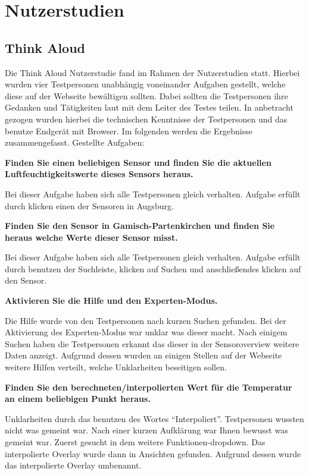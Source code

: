 \section{Nutzerstudien}
\subsection{Think Aloud}
Die Think Aloud Nutzerstudie fand im Rahmen der Nutzerstudien statt. Hierbei wurden vier Testpersonen unabhängig voneinander Aufgaben gestellt,
welche diese auf der Webseite bewältigen sollten. Dabei sollten die Testpersonen ihre Gedanken und Tätigkeiten laut mit dem Leiter des Testes teilen.
In anbetracht gezogen wurden hierbei die technischen Kenntnisse der Testpersonen und das benutze Endgerät mit Browser. Im folgenden werden die Ergebnisse zusammengefasst.
Gestellte Aufgaben:

\textbf{Finden Sie einen beliebigen Sensor und finden Sie die aktuellen Luftfeuchtigkeitswerte dieses Sensors heraus.}

Bei dieser Aufgabe haben sich alle Testpersonen gleich verhalten. 
Aufgabe erfüllt durch klicken einen der Sensoren in Augsburg.

\textbf{Finden Sie den Sensor in Gamisch-Partenkirchen und finden Sie heraus welche Werte dieser Sensor misst.}

Bei dieser Aufgabe haben sich alle Testpersonen gleich verhalten. 
Aufgabe erfüllt durch benutzen der Suchleiste, klicken auf Suchen und anschließendes klicken auf den Sensor.

\textbf{Aktivieren Sie die Hilfe und den Experten-Modus.}

Die Hilfe wurde von den Testpersonen nach kurzen Suchen gefunden.
Bei der Aktivierung des Experten-Modus war unklar was dieser macht. Nach einigem Suchen haben die Testpersonen erkannt das dieser in der Sensoroverview weitere Daten anzeigt.
Aufgrund dessen wurden an einigen Stellen auf der Webseite weitere Hilfen verteilt, welche Unklarheiten beseitigen sollen. 

\textbf{Finden Sie den berechneten/interpolierten Wert für die Temperatur an einem beliebigen Punkt heraus.}

Unklarheiten durch das benutzen des Wortes \enquote{Interpoliert}. Testpersonen wussten nicht was gemeint war. Nach einer kurzen Aufklärung war Ihnen bewusst
was gemeint war. 
Zuerst gesucht in dem weitere Funktionen-dropdown. Das interpolierte Overlay wurde dann in Ansichten gefunden.
Aufgrund dessen wurde das interpolierte Overlay umbenannt. 

